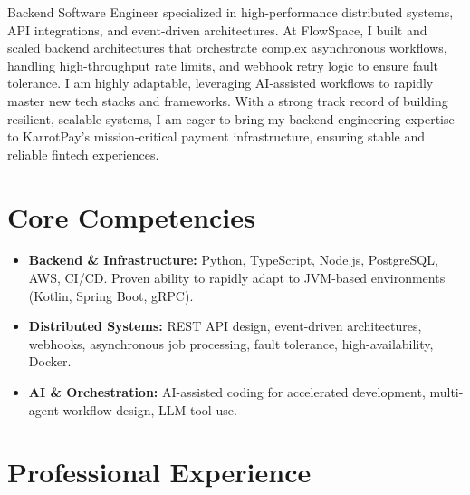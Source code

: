 \documentclass[11pt,a4paper,sans]{moderncv}
\begin{document}
\makecvtitle

Backend Software Engineer specialized in high-performance distributed systems, API integrations, and event-driven architectures. At FlowSpace, I built and scaled backend architectures that orchestrate complex asynchronous workflows, handling high-throughput rate limits, and webhook retry logic to ensure fault tolerance. I am highly adaptable, leveraging AI-assisted workflows to rapidly master new tech stacks and frameworks. With a strong track record of building resilient, scalable systems, I am eager to bring my backend engineering expertise to KarrotPay's mission-critical payment infrastructure, ensuring stable and reliable fintech experiences.

\section{Core Competencies}
\begin{itemize}
\item \textbf{Backend \& Infrastructure:} Python, TypeScript, Node.js, PostgreSQL, AWS, CI/CD. Proven ability to rapidly adapt to JVM-based environments (Kotlin, Spring Boot, gRPC).
\item \textbf{Distributed Systems:} REST API design, event-driven architectures, webhooks, asynchronous job processing, fault tolerance, high-availability, Docker.
\item \textbf{AI \& Orchestration:} AI-assisted coding for accelerated development, multi-agent workflow design, LLM tool use.
\end{itemize}

\section{Professional Experience}
\end{document}
